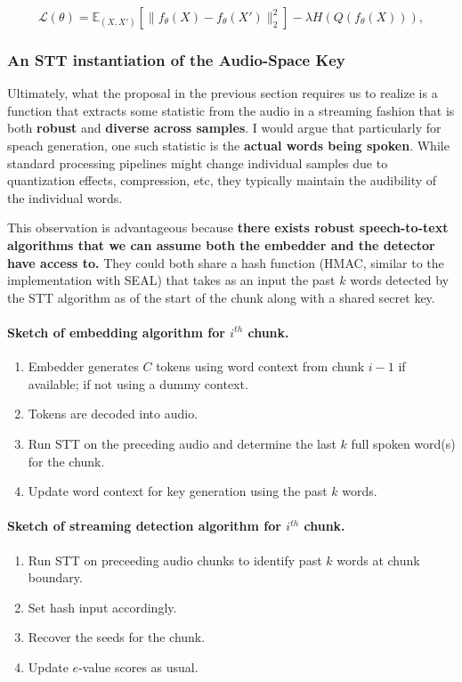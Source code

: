 \documentclass[12pt]{article}
\theoremstyle{plain}
\theoremstyle{definition}
\begin{document}
\begin{equation}
\mathcal{L}(\theta)
=
\mathbb{E}_{(X,X')}
\left[
\|f_\theta(X)-f_\theta(X')\|_2^2
\right]
-\lambda H\left(Q(f_\theta(X))\right),
\end{equation}




\subsubsection{An STT instantiation of the Audio-Space Key}
Ultimately, what the proposal in the previous section requires us to realize is a function that extracts some statistic from the audio in a streaming fashion that is both \textbf{robust} and \textbf{diverse across samples}. I would argue that particularly for speach generation, one such statistic is the \textbf{actual words being spoken}. While standard processing pipelines might change individual samples due to quantization effects, compression, etc, they typically maintain the audibility of the individual words.

This observation is advantageous because \textbf{there exists robust speech-to-text algorithms that we can assume both the embedder and the detector have access to.} They could both share a hash function (HMAC, similar to the implementation with SEAL) that takes as an input the past $k$ words detected by the STT algorithm as of the start of the chunk along with a shared secret key. 

\paragraph{Sketch of embedding algorithm for $i^{th}$ chunk.}
\begin{enumerate}
    \item Embedder generates $C$ tokens using word context from chunk $i-1$ if available; if not using a dummy context.
    \item Tokens are decoded into audio.
    \item Run STT on the preceding audio and determine the last $k$ full spoken word(s) for the chunk.
    \item Update word context for key generation using the past $k$ words.
\end{enumerate}

\paragraph{Sketch of streaming detection algorithm for $i^{th}$ chunk.}
\begin{enumerate}
    \item Run STT on preceeding audio chunks to identify past $k$ words at chunk boundary.
    \item Set hash input accordingly.
    \item Recover the seeds for the chunk.
    \item Update $e$-value scores as usual.
\end{enumerate}
\end{document}
